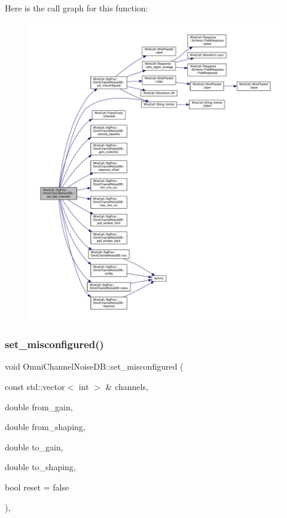 Here is the call graph for this function\+:
\nopagebreak
\begin{figure}[H]
\begin{center}
\leavevmode
\includegraphics[width=350pt]{class_wire_cell_1_1_sig_proc_1_1_omni_channel_noise_d_b_a42c1e7613ec776da66d7f30238128ce7_cgraph}
\end{center}
\end{figure}
\mbox{\label{class_wire_cell_1_1_sig_proc_1_1_omni_channel_noise_d_b_a7a1a60aef8d2935c36e27a735117a1cb}} 
\subsubsection{\texorpdfstring{set\+\_\+misconfigured()}{set\_misconfigured()}}
{\footnotesize\ttfamily void Omni\+Channel\+Noise\+D\+B\+::set\+\_\+misconfigured (\begin{DoxyParamCaption}\item[{const std\+::vector$<$ int $>$ \&}]{channels,  }\item[{double}]{from\+\_\+gain,  }\item[{double}]{from\+\_\+shaping,  }\item[{double}]{to\+\_\+gain,  }\item[{double}]{to\+\_\+shaping,  }\item[{bool}]{reset = {\ttfamily false} }\end{DoxyParamCaption})\hspace{0.3cm}{\ttfamily [protected]}, {\ttfamily [virtual]}}



